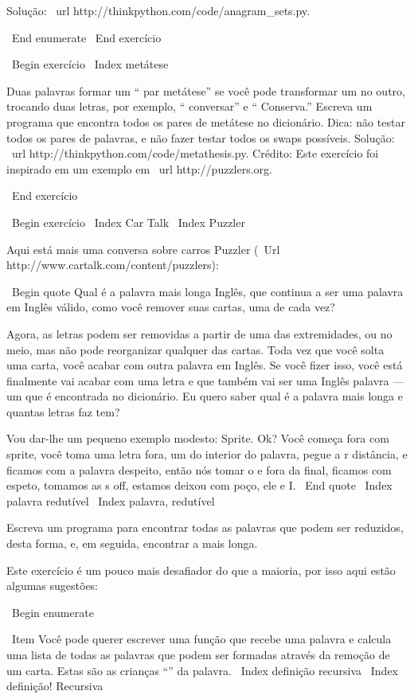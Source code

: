 \documentclass[10pt]{book}
\begin{document}
{{{{{{{{{Solução: \ url {http://thinkpython.com/code/anagram_sets.py}.

\ End {enumerate}
\ End {} exercício

\ Begin {} exercício
\ Index {} metátese

Duas palavras formar um `` par metátese'' se você pode transformar um no
outro, trocando duas letras, por exemplo, `` conversar'' e
`` Conserva.'' Escreva um programa que encontra todos os pares de metátese
no dicionário. Dica: não testar todos os pares de palavras, e não fazer
testar todos os swaps possíveis. Solução: \ url {http://thinkpython.com/code/metathesis.py}.
Crédito: Este exercício foi inspirado em um exemplo em \ url {http://puzzlers.org}.

\ End {} exercício



\ Begin {} exercício
\ Index {Car Talk}
\ Index {} Puzzler

Aqui está mais uma conversa sobre carros Puzzler
(\ Url {http://www.cartalk.com/content/puzzlers}):

\ Begin {quote}
Qual é a palavra mais longa Inglês, que continua a ser uma palavra em Inglês válido,
como você remover suas cartas, uma de cada vez?

Agora, as letras podem ser removidas a partir de uma das extremidades, ou no meio, mas
não pode reorganizar qualquer das cartas. Toda vez que você solta uma carta, você
acabar com outra palavra em Inglês. Se você fizer isso, você está finalmente
vai acabar com uma letra e que também vai ser uma
Inglês palavra --- um que é encontrada no dicionário. Eu quero saber
qual é a palavra mais longa e quantas letras faz
tem?

Vou dar-lhe um pequeno exemplo modesto: Sprite. Ok? Você começa
fora com sprite, você toma uma letra fora, um do interior do
palavra, pegue a r distância, e ficamos com a palavra despeito, então nós
tomar o e fora da final, ficamos com espeto, tomamos as s off, estamos
deixou com poço, ele e I.
\ End {quote}
\ Index {palavra redutível}
\ Index {palavra, redutível}

Escreva um programa para encontrar todas as palavras que podem ser reduzidos, desta forma,
e, em seguida, encontrar a mais longa.

Este exercício é um pouco mais desafiador do que a maioria, por isso aqui estão
algumas sugestões:

\ Begin {enumerate}

\ Item Você pode querer escrever uma função que recebe uma palavra e
  calcula uma lista de todas as palavras que podem ser formadas através da remoção de um
  carta. Estas são as crianças ``'' da palavra.
\ Index {definição recursiva}
\ Index {definição! Recursiva}

}}}}}}}}}
\end{document}
